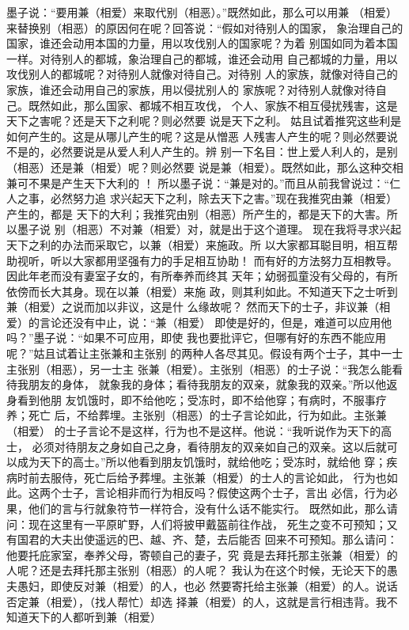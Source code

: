 \documentclass[12pt,UTF8]{ctexbook}
\begin{document}
墨子说：“要用兼（相爱）来取代别（相恶）。”既然如此，那么可以用兼 
（相爱）来替换别（相恶）的原因何在呢？回答说：“假如对待别人的国家， 
象治理自己的国家，谁还会动用本国的力量，用以攻伐别人的国家呢？为着 
别国如同为着本国一样。对待别人的都城，象治理自己的都城，谁还会动用 
自己都城的力量，用以攻伐别人的都城呢？对待别人就像对待自己。对待别 
人的家族，就像对待自己的家族，谁还会动用自己的家族，用以侵扰别人的 
家族呢？对待别人就像对待自己。既然如此，那么国家、都城不相互攻伐， 
个人、家族不相互侵扰残害，这是天下之害呢？还是天下之利呢？则必然要 
说是天下之利。 
姑且试着推究这些利是如何产生的。这是从哪儿产生的呢？这是从憎恶 
人残害人产生的呢？则必然要说不是的，必然要说是从爱人利人产生的。辨 
别一下名目：世上爱人利人的，是别（相恶）还是兼（相爱）呢？则必然要 
说是兼（相爱）。既然如此，那么这种交相兼可不果是产生天下大利的 ！ 
所以墨子说：“兼是对的。”而且从前我曾说过：“仁人之事，必然努力追 
求兴起天下之利，除去天下之害。”现在我推究由兼（相爱）产生的，都是 
天下的大利；我推究由别（相恶）所产生的，都是天下的大害。所以墨子说 
别（相恶）不对兼（相爱）对，就是出于这个道理。 
现在我将寻求兴起天下之利的办法而采取它，以兼（相爱）来施政。所 
以大家都耳聪目明，相互帮助视听，听以大家都用坚强有力的手足相互协助！ 
而有好的方法努力互相教导。因此年老而没有妻室子女的，有所奉养而终其 
天年；幼弱孤童没有父母的，有所依傍而长大其身。现在以兼（相爱）来施 
政，则其利如此。不知道天下之士听到兼（相爱）之说而加以非议，这是什 
么缘故呢？ 
然而天下的士子，非议兼（相爱）的言论还没有中止，说：“兼（相爱） 
即使是好的，但是，难道可以应用他吗？”墨子说：“如果不可应用，即使 
我也要批评它，但哪有好的东西不能应用呢？”姑且试着让主张兼和主张别 
的两种人各尽其见。假设有两个士子，其中一士主张别（相恶），另一士主 
张兼（相爱）。主张别（相恶）的士子说：“我怎么能看待我朋友的身体， 
就象我的身体；看待我朋友的双亲，就象我的双亲。”所以他返身看到他朋 
友饥饿时，即不给他吃；受冻时，即不给他穿；有病时，不服事疗养；死亡 
后，不给葬埋。主张别（相恶）的士子言论如此，行为如此。主张兼（相爱） 
的士子言论不是这样，行为也不是这样。他说：“我听说作为天下的高士， 
必须对待朋友之身如自己之身，看待朋友的双亲如自己的双亲。这以后就可 
以成为天下的高士。”所以他看到朋友饥饿时，就给他吃；受冻时，就给他 
穿；疾病时前去服侍，死亡后给予葬埋。主张兼（相爱）的士人的言论如此， 
行为也如此。这两个士子，言论相非而行为相反吗？假使这两个士子，言出 
必信，行为必果，他们的言与行就象符节一样符合，没有什么话不能实行。 
既然如此，那么请问：现在这里有一平原旷野，人们将披甲戴盔前往作战， 
死生之变不可预知；又有国君的大夫出使遥远的巴、越、齐、楚，去后能否 
回来不可预知。那么请问：他要托庇家室，奉养父母，寄顿自己的妻子，究 
竟是去拜托那主张兼（相爱）的人呢？还是去拜托那主张别（相恶）的人呢？ 
我认为在这个时候，无论天下的愚夫愚妇，即使反对兼（相爱）的人，也必 
然要寄托给主张兼（相爱）的人。说话否定兼（相爱），（找人帮忙）却选 
择兼（相爱）的人，这就是言行相违背。我不知道天下的人都听到兼（相爱） 
\end{document}
